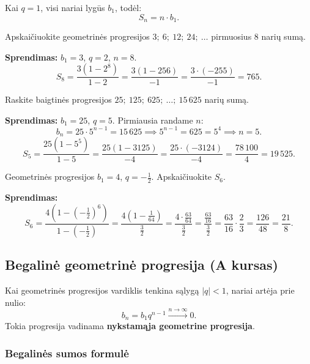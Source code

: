 \begin{remark}
Kai $q = 1$, visi nariai lygūs $b_1$, todėl:
\[
    S_n = n \cdot b_1.
\]
\end{remark}

\begin{example}
Apskaičiuokite geometrinės progresijos $3;\ 6;\ 12;\ 24;\ \ldots$ pirmuosius 8 narių sumą.

\textbf{Sprendimas:} $b_1 = 3$, $q = 2$, $n = 8$.
\[
    S_8 = \frac{3(1 - 2^8)}{1 - 2} = \frac{3(1 - 256)}{-1} = \frac{3 \cdot (-255)}{-1} = 765.
\]
\end{example}

\begin{example}
Raskite baigtinės progresijos $25;\ 125;\ 625;\ \ldots;\ 15\,625$ narių sumą.

\textbf{Sprendimas:} $b_1 = 25$, $q = 5$. Pirmiausia randame $n$:
\[
    b_n = 25 \cdot 5^{n-1} = 15\,625 \implies 5^{n-1} = 625 = 5^4 \implies n = 5.
\]
\[
    S_5 = \frac{25(1 - 5^5)}{1 - 5} = \frac{25(1 - 3125)}{-4} = \frac{25 \cdot (-3124)}{-4} = \frac{78\,100}{4} = 19\,525.
\]
\end{example}

\begin{exercise}
Geometrinės progresijos $b_1 = 4$, $q = -\tfrac{1}{2}$. Apskaičiuokite $S_6$.

\textbf{Sprendimas:}
\[
    S_6 = \frac{4\!\left(1 - \left(-\tfrac{1}{2}\right)^6\right)}{1 - \left(-\tfrac{1}{2}\right)}
        = \frac{4\!\left(1 - \tfrac{1}{64}\right)}{\tfrac{3}{2}}
        = \frac{4 \cdot \tfrac{63}{64}}{\tfrac{3}{2}}
        = \frac{\tfrac{63}{16}}{\tfrac{3}{2}}
        = \frac{63}{16} \cdot \frac{2}{3}
        = \frac{126}{48} = \frac{21}{8}.
\]
\end{exercise}

\subsection{Begalinė geometrinė progresija (A kursas)}

Kai geometrinės progresijos vardiklis tenkina sąlygą $|q| < 1$, nariai artėja prie nulio:
\[
    b_n = b_1 q^{n-1} \xrightarrow{n \to \infty} 0.
\]
Tokia progresija vadinama \textbf{nykstamąja geometrine progresija}.

\subsubsection*{Begalinės sumos formulė}

